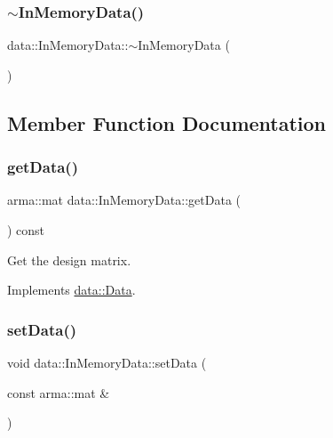 \subsubsection{\texorpdfstring{$\sim$\+In\+Memory\+Data()}{~InMemoryData()}}
{\footnotesize\ttfamily data\+::\+In\+Memory\+Data\+::$\sim$\+In\+Memory\+Data (\begin{DoxyParamCaption}{ }\end{DoxyParamCaption})}



\subsection{Member Function Documentation}
\mbox{\label{classdata_1_1_in_memory_data_ac0993c38a9633fa0f1ff787660b86c71}} 
\subsubsection{\texorpdfstring{get\+Data()}{getData()}}
{\footnotesize\ttfamily arma\+::mat data\+::\+In\+Memory\+Data\+::get\+Data (\begin{DoxyParamCaption}{ }\end{DoxyParamCaption}) const\hspace{0.3cm}{\ttfamily [virtual]}}



Get the design matrix. 



Implements \mbox{\hyperlink{classdata_1_1_data_aa4073af1bc8ccc7c50809e1676436eb4}{data\+::\+Data}}.

\mbox{\label{classdata_1_1_in_memory_data_a0456d66f7930809211c75bcdd80a7bca}} 
\subsubsection{\texorpdfstring{set\+Data()}{setData()}}
{\footnotesize\ttfamily void data\+::\+In\+Memory\+Data\+::set\+Data (\begin{DoxyParamCaption}\item[{const arma\+::mat \&}]{ }\end{DoxyParamCaption})\hspace{0.3cm}{\ttfamily [virtual]}}



